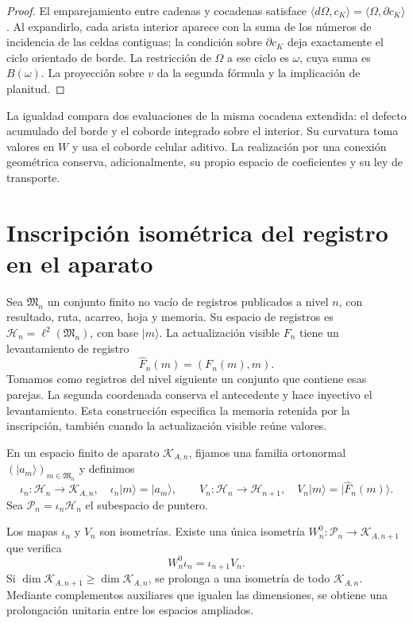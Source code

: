 \begin{proof}
El emparejamiento entre cadenas y cocadenas satisface
\(\langle d\Omega,c_K\rangle=\langle\Omega,\partial c_K\rangle\).
Al expandirlo, cada arista interior aparece con la suma de los números
de incidencia de las celdas contiguas; la condición sobre
\(\partial c_K\) deja exactamente el ciclo orientado de borde.
La restricción de \(\Omega\) a ese ciclo es \(\omega\), cuya suma
es \(B(\omega)\). La proyección sobre \(v\) da la segunda fórmula
y la implicación de planitud.
\end{proof}

La igualdad compara dos evaluaciones de la misma cocadena extendida:
el defecto acumulado del borde y el coborde integrado sobre el interior.
Su curvatura toma valores en \(W\) y usa el coborde celular aditivo.
La realización por una conexión geométrica conserva, adicionalmente,
su propio espacio de coeficientes y su ley de transporte.

\section{Inscripción isométrica del registro en el aparato}
\label{x_reciprocidad:vii:sec:observador-aparato}

Sea \(\mathfrak M_n\) un conjunto finito no vacío de registros
publicados a nivel \(n\), con resultado, ruta, acarreo, hoja y memoria.
Su espacio de registros es
\(\mathcal H_n=\ell^2(\mathfrak M_n)\), con base \(|m\rangle\).
La actualización visible \(F_n\) tiene un levantamiento de registro
\[
 \widehat F_n(m)=(F_n(m),m).
\]
Tomamos como registros del nivel siguiente un conjunto que contiene esas
parejas. La segunda coordenada conserva el antecedente y hace inyectivo
el levantamiento. Esta construcción especifica la memoria retenida por
la inscripción, también cuando la actualización visible reúne valores.

En un espacio finito de aparato \(\mathcal K_{A,n}\), fijamos una
familia ortonormal \((|a_m\rangle)_{m\in\mathfrak M_n}\) y definimos
\[
 \iota_n:\mathcal H_n\longrightarrow\mathcal K_{A,n},
 \quad \iota_n|m\rangle=|a_m\rangle,
 \qquad
 V_n:\mathcal H_n\longrightarrow\mathcal H_{n+1},
 \quad V_n|m\rangle=|\widehat F_n(m)\rangle.
\]
Sea \(\mathcal P_n=\iota_n\mathcal H_n\) el subespacio de puntero.

\begin{theorem}
\label{x_reciprocidad:vii:thm:observador-entrelazador}
Los mapas \(\iota_n\) y \(V_n\) son isometrías. Existe una única
isometría \(W_n^0:\mathcal P_n\longrightarrow\mathcal K_{A,n+1}\)
que verifica
\begin{equation}
 W_n^0\iota_n=\iota_{n+1}V_n.
 \label{x_reciprocidad:vii:eq:observador-cuadrado}
\end{equation}
Si \(\dim\mathcal K_{A,n+1}\geq\dim\mathcal K_{A,n}\),
se prolonga a una isometría de todo \(\mathcal K_{A,n}\).
Mediante complementos auxiliares que igualen las dimensiones, se obtiene
una prolongación unitaria entre los espacios ampliados.
\end{theorem}

